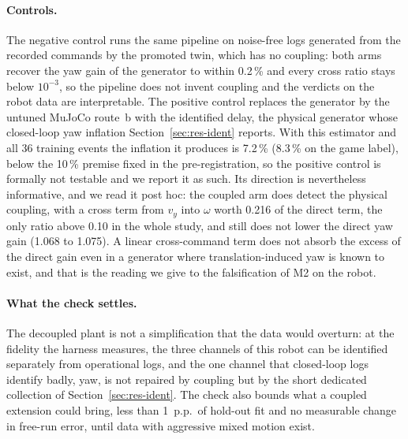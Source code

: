 \paragraph{Controls.} The negative control runs the same pipeline on noise-free logs generated from the recorded commands by the promoted twin, which has no coupling: both arms recover the yaw gain of the generator to within 0.2\,\% and every cross ratio stays below $10^{-3}$, so the pipeline does not invent coupling and the verdicts on the robot data are interpretable. The positive control replaces the generator by the untuned MuJoCo route~b with the identified delay, the physical generator whose closed-loop yaw inflation Section~\ref{sec:res-ident} reports. With this estimator and all 36 training events the inflation it produces is 7.2\,\% (8.3\,\% on the game label), below the 10\,\% premise fixed in the pre-registration, so the positive control is formally not testable and we report it as such. Its direction is nevertheless informative, and we read it post hoc: the coupled arm does detect the physical coupling, with a cross term from $v_y$ into $\omega$ worth 0.216 of the direct term, the only ratio above 0.10 in the whole study, and still does not lower the direct yaw gain (1.068 to 1.075). A linear cross-command term does not absorb the excess of the direct gain even in a generator where translation-induced yaw is known to exist, and that is the reading we give to the falsification of M2 on the robot.

\paragraph{What the check settles.} The decoupled plant is not a simplification that the data would overturn: at the fidelity the harness measures, the three channels of this robot can be identified separately from operational logs, and the one channel that closed-loop logs identify badly, yaw, is not repaired by coupling but by the short dedicated collection of Section~\ref{sec:res-ident}. The check also bounds what a coupled extension could bring, less than 1~p.p.\ of hold-out fit and no measurable change in free-run error, until data with aggressive mixed motion exist.
